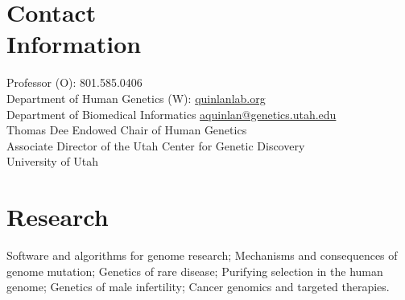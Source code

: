 \documentclass[margin,line]{cv}
\begin{document}
\begin{resume}
    \section{\mysidestyle Contact\\Information}
    Professor                                                         \hfill (O): 801.585.0406\\%
    Department of Human Genetics                                                    \hfill (W): \url{quinlanlab.org}\\%
    Department of Biomedical Informatics                                     \hfill \url{aquinlan@genetics.utah.edu} \\%
    Thomas Dee Endowed Chair of Human Genetics                                                                       \\%
    Associate Director of the Utah Center for Genetic Discovery                                                      \\%
    University of Utah                                                                                       \hfill  \\%

    \section{\mysidestyle Research} Software and algorithms for genome research; 
    Mechanisms and consequences of genome mutation;  Genetics of rare disease; 
    Purifying selection in the human genome; Genetics of male infertility; 
    Cancer genomics and targeted therapies.
    

\end{resume}
\end{document}
